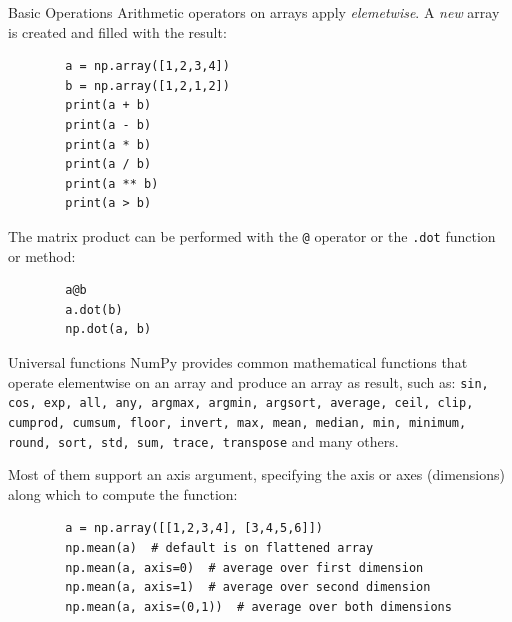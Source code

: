 \documentclass[aspectratio=169,]{beamer}
\begin{document}
\begin{frame}{Basic Operations}
    Arithmetic operators on arrays apply \emph{elemetwise}.
    A \emph{new} array is created and filled with the result:
    \begin{verbatim}
        a = np.array([1,2,3,4])
        b = np.array([1,2,1,2])
        print(a + b)
        print(a - b)
        print(a * b)
        print(a / b)
        print(a ** b)
        print(a > b)
    \end{verbatim}

    \framebreak
    The matrix product can be performed with the \texttt{@} operator or the \texttt{.dot} function or method:
    \begin{verbatim}
        a@b
        a.dot(b)
        np.dot(a, b)
    \end{verbatim}
\end{frame}

\begin{frame}{Universal functions}
    NumPy provides common mathematical functions that operate elementwise on an array and produce an array as result,
    such as:
    \texttt{sin, cos, exp, all, any, argmax, argmin, argsort, average, ceil, clip, cumprod, cumsum, floor, invert, max,
    mean, median, min, minimum, round, sort, std, sum, trace, transpose} and many others.

    \framebreak
    Most of them support an axis argument, specifying the axis or axes (dimensions) along which to compute the function:
    \begin{verbatim}
        a = np.array([[1,2,3,4], [3,4,5,6]])
        np.mean(a)  # default is on flattened array
        np.mean(a, axis=0)  # average over first dimension
        np.mean(a, axis=1)  # average over second dimension
        np.mean(a, axis=(0,1))  # average over both dimensions
    \end{verbatim}
\end{frame}
\end{document}
